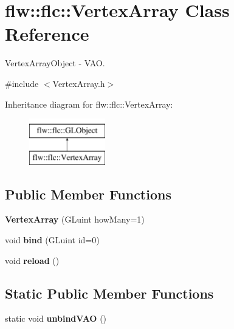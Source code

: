 \hypertarget{classflw_1_1flc_1_1VertexArray}{}\section{flw\+:\+:flc\+:\+:Vertex\+Array Class Reference}
\label{classflw_1_1flc_1_1VertexArray}


Vertex\+Array\+Object -\/ V\+AO.  




{\ttfamily \#include $<$Vertex\+Array.\+h$>$}

Inheritance diagram for flw\+:\+:flc\+:\+:Vertex\+Array\+:\begin{figure}[H]
\begin{center}
\leavevmode
\includegraphics[height=2.000000cm]{classflw_1_1flc_1_1VertexArray}
\end{center}
\end{figure}
\subsection*{Public Member Functions}
\begin{DoxyCompactItemize}
\item 
\mbox{\label{classflw_1_1flc_1_1VertexArray_ad8fb32bc36e3f00b86b1b04a9892669b}} 
{\bfseries Vertex\+Array} (G\+Luint how\+Many=1)
\item 
\mbox{\label{classflw_1_1flc_1_1VertexArray_a39a6e1517e1a32a225dd16a88e3492bf}} 
void {\bfseries bind} (G\+Luint id=0)
\item 
\mbox{\label{classflw_1_1flc_1_1VertexArray_ac622afe3735e3ff34df3b2d74fdd57aa}} 
void {\bfseries reload} ()
\end{DoxyCompactItemize}
\subsection*{Static Public Member Functions}
\begin{DoxyCompactItemize}
\item 
\mbox{\label{classflw_1_1flc_1_1VertexArray_ac879f5d878b5eb8265ed2b1bd119ca7a}} 
static void {\bfseries unbind\+V\+AO} ()
\end{DoxyCompactItemize}
